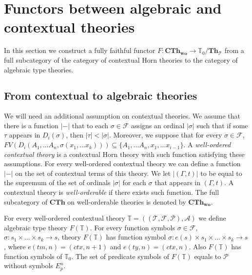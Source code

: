\documentclass[reqno]{amsart}
\theoremstyle{definition}
\theoremstyle{remark}
\newcommand{\cat}[1]{\mathbf{#1}}
\newcommand{\Th}{\cat{Th}}
\newcommand{\CTh}{\cat{CTh}}
\newcommand{\woCTh}{\cat{CTh_{wo}}}
\newcommand{\ThT}{\Th_{\mathcal{T}}}
\numberwithin{figure}{section}
\begin{document}
\section{Functors between algebraic and contextual theories}

In this section we construct a fully faithful functor $F : \woCTh \to \mathbb{T}_0/\ThT$
    from a full subcategory of the category of contextual Horn theories to the category of algebraic type theories.

\subsection{From contextual to algebraic theories}

We will need an additional assumption on contextual theories.
We assume that there is a function $|-|$ that to each $\sigma \in \mathcal{F}$ assigns an ordinal $|\sigma|$ such that if some $\tau$ appears in $D_i(\sigma)$, then $|\tau| < |\sigma|$.
Moreover, we suppose that for every $\sigma \in \mathcal{F}$, $FV(D_i(A_1, \ldots A_n, \sigma(x_1, \ldots x_k))) \subseteq \{ A_1, \ldots A_n, x_1, \ldots x_{i-1} \}$.
A \emph{well-ordered contextual theory} is a contextual Horn theory with such function satisfying these assumptions.
For every well-ordered contextual theory we can define a function $|-|$ on the set of contextual terms of this theory.
We let $|(\Gamma,t)|$ to be equal to the supremum of the set of ordinals $|\sigma|$ for each $\sigma$ that appears in $(\Gamma,t)$.
A contextual theory is \emph{well-orderable} if there exists such function.
The full subcategory of $\CTh$ on well-orderable theories is denoted by $\woCTh$.

For every well-ordered contextual theory $\mathbb{T} = ((\mathcal{T},\mathcal{F},\mathcal{P}),\mathcal{A})$ we define algebraic type theory $F(\mathbb{T})$.
For every function symbols $\sigma \in \mathcal{F}$, $\sigma : s_1 \times \ldots \times s_k \to s$,
    theory $F(\mathbb{T})$ has function symbol $\sigma : e(s) \times s_1 \times \ldots \times s_k \to s$,
    where $e(tm,n) = (ctx,n+1)$ and $e(ty,n) = (ctx,n)$.
Also $F(\mathbb{T})$ has function symbols of $\mathbb{T}_0$.
The set of predicate symbols of $F(\mathbb{T})$ equals to $\mathcal{P}$ without symbols $E^n_p$.
\end{document}
